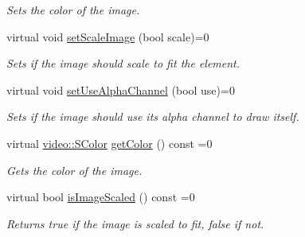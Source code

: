 \begin{DoxyCompactItemize}
\begin{DoxyCompactList}\small\item\em Sets the color of the image. \end{DoxyCompactList}\item 
\mbox{\label{classirr_1_1gui_1_1IGUIImage_a642c5683600be82efa0cc04b4236e34d}} 
virtual void \hyperlink{classirr_1_1gui_1_1IGUIImage_a642c5683600be82efa0cc04b4236e34d}{set\+Scale\+Image} (bool scale)=0
\begin{DoxyCompactList}\small\item\em Sets if the image should scale to fit the element. \end{DoxyCompactList}\item 
\mbox{\label{classirr_1_1gui_1_1IGUIImage_a9426b40769f4ef7614e6a94dcfa67455}} 
virtual void \hyperlink{classirr_1_1gui_1_1IGUIImage_a9426b40769f4ef7614e6a94dcfa67455}{set\+Use\+Alpha\+Channel} (bool use)=0
\begin{DoxyCompactList}\small\item\em Sets if the image should use its alpha channel to draw itself. \end{DoxyCompactList}\item 
\mbox{\label{classirr_1_1gui_1_1IGUIImage_a46a6dc23dd045cb65247344bf71078e4}} 
virtual \hyperlink{classirr_1_1video_1_1SColor}{video\+::\+S\+Color} \hyperlink{classirr_1_1gui_1_1IGUIImage_a46a6dc23dd045cb65247344bf71078e4}{get\+Color} () const =0
\begin{DoxyCompactList}\small\item\em Gets the color of the image. \end{DoxyCompactList}\item 
\mbox{\label{classirr_1_1gui_1_1IGUIImage_aca24045ee740242b9c8de73a8f609a27}} 
virtual bool \hyperlink{classirr_1_1gui_1_1IGUIImage_aca24045ee740242b9c8de73a8f609a27}{is\+Image\+Scaled} () const =0
\begin{DoxyCompactList}\small\item\em Returns true if the image is scaled to fit, false if not. \end{DoxyCompactList}\item 
\mbox{\label{classirr_1_1gui_1_1IGUIImage_a5be6faec4c156fc955c84a5b3f703d63}} 

\end{DoxyCompactItemize}
